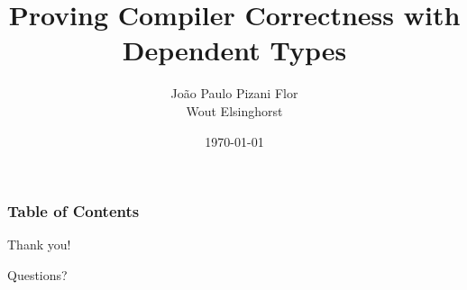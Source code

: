 \documentclass[notes]{beamer}
\title[Compiler Correctness]{Proving Compiler Correctness with Dependent Types}
\date{\today}
\author[J. P. Pizani Flor, W. Elsignhorst]{
    João Paulo Pizani Flor \\
    Wout Elsinghorst
}
\institute[Utrecht University] {
    Department of Information and Computing Sciences \\
    Utrecht University
}
\begin{document}
    \begin{frame}
        \titlepage
    \end{frame}

    \begin{frame}
        \frametitle{Table of Contents}
        \tableofcontents
    \end{frame}


    
    
    


    \begin{frame}[plain]
        \begin{center}
            \par{\Huge{Thank you!}}
            \vspace{2.0cm}
            \par{\Huge{Questions?}}
        \end{center}
    \end{frame}
\end{document}
